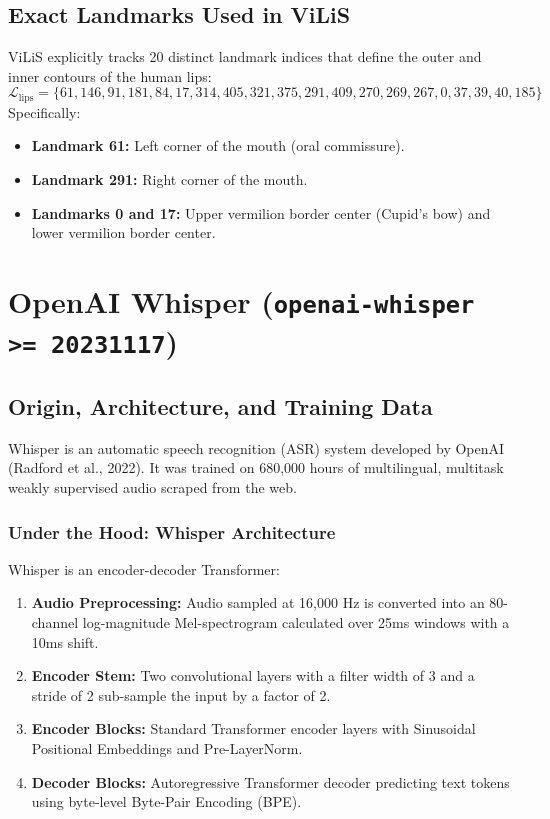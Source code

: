 \documentclass[11pt,a4paper]{report}
\begin{document}
\subsection{Exact Landmarks Used in ViLiS}
ViLiS explicitly tracks 20 distinct landmark indices that define the outer and inner contours of the human lips:
$$\mathcal{L}_{\text{lips}} = \{61, 146, 91, 181, 84, 17, 314, 405, 321, 375, 291, 409, 270, 269, 267, 0, 37, 39, 40, 185\}$$
Specifically:
\begin{itemize}
    \item \textbf{Landmark 61:} Left corner of the mouth (oral commissure).
    \item \textbf{Landmark 291:} Right corner of the mouth.
    \item \textbf{Landmarks 0 and 17:} Upper vermilion border center (Cupid's bow) and lower vermilion border center.
\end{itemize}

\section{OpenAI Whisper (\texttt{openai-whisper >= 20231117})}
\subsection{Origin, Architecture, and Training Data}
Whisper is an automatic speech recognition (ASR) system developed by OpenAI (Radford et al., 2022). It was trained on 680,000 hours of multilingual, multitask weakly supervised audio scraped from the web.
\subsubsection{Under the Hood: Whisper Architecture}
Whisper is an encoder-decoder Transformer:
\begin{enumerate}
    \item \textbf{Audio Preprocessing:} Audio sampled at 16,000 Hz is converted into an 80-channel log-magnitude Mel-spectrogram calculated over 25ms windows with a 10ms shift.
    \item \textbf{Encoder Stem:} Two convolutional layers with a filter width of 3 and a stride of 2 sub-sample the input by a factor of 2.
    \item \textbf{Encoder Blocks:} Standard Transformer encoder layers with Sinusoidal Positional Embeddings and Pre-LayerNorm.
    \item \textbf{Decoder Blocks:} Autoregressive Transformer decoder predicting text tokens using byte-level Byte-Pair Encoding (BPE).
\end{enumerate}
\end{document}
